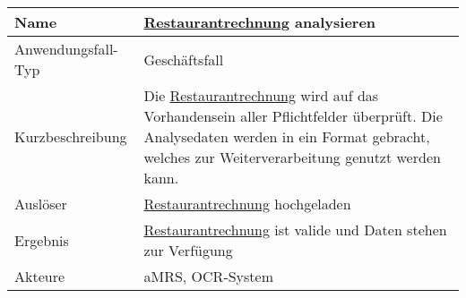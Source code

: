 \begin{table}[H]
    \centering
    \label{RestaurantRechnungAnalysieren}
    \begin{tabularx}{\textwidth}{| l | X |}
        \hline
        Name               & \hyperref[gls:restaurantRechnung]{Restaurantrechnung} analysieren                                                                                                                                                       \\
        \hline
        Anwendungsfall-Typ & Geschäftsfall                                                                                                                                                                                                           \\
        \hline
        Kurzbeschreibung   & Die \hyperref[gls:restaurantRechnung]{Restaurantrechnung} wird auf das Vorhandensein aller Pflichtfelder überprüft. Die Analysedaten werden in ein Format gebracht, welches zur Weiterverarbeitung genutzt werden kann. \\
        \hline
        Auslöser           & \hyperref[gls:restaurantRechnung]{Restaurantrechnung} hochgeladen                                                                                                                                                       \\
        \hline
        Ergebnis           & \hyperref[gls:restaurantRechnung]{Restaurantrechnung} ist valide und Daten stehen zur Verfügung                                                                                                                         \\
        \hline
        Akteure            & \ac{aMRS}, OCR-System                                                                                                                                                                                                   \\
        \hline
    \end{tabularx}
\end{table}


